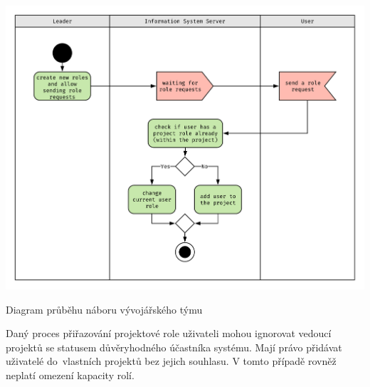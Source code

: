 \begin{fig:illustration}
   \includegraphics[width=1\textwidth]{images/dia-ak-role-assing.pdf}
   \caption[Diagram průběhu náboru týmu]{Diagram průběhu náboru vývojářského týmu}\label{pic:dia-ak-role-assing}
\end{fig:illustration}

\newpage
Daný proces přiřazování projektové role uživateli mohou ignorovat vedoucí projektů se statusem důvěryhodného účastníka systému. Mají právo přidávat uživatelé do~vlastních projektů bez jejich souhlasu. V tomto případě rovněž neplatí omezení kapacity rolí.
